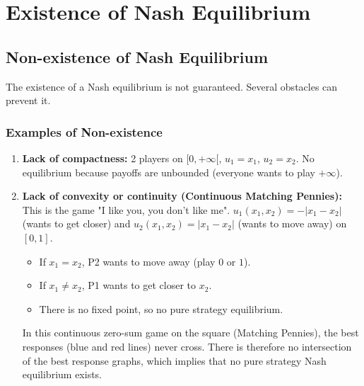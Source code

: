 \chapter{Existence of Nash Equilibrium}

\section{Non-existence of Nash Equilibrium}

The existence of a Nash equilibrium is not guaranteed. Several obstacles can prevent it.

\subsection{Examples of Non-existence}
\begin{enumerate}
    \item \textbf{Lack of compactness:} 2 players on $[0, +\infty[$, $u_1 = x_1$, $u_2 = x_2$. No equilibrium because payoffs are unbounded (everyone wants to play $+\infty$).
    \item \textbf{Lack of convexity or continuity (Continuous Matching Pennies):}
    This is the game "I like you, you don't like me". $u_1(x_1, x_2) = -|x_1 - x_2|$ (wants to get closer) and $u_2(x_1, x_2) = |x_1 - x_2|$ (wants to move away) on $[0,1]$.
    \begin{itemize}
        \item If $x_1 = x_2$, P2 wants to move away (play $0$ or $1$).
        \item If $x_1 \ne x_2$, P1 wants to get closer to $x_2$.
        \item There is no fixed point, so no pure strategy equilibrium.
    \end{itemize}
    
\begin{center}
\end{center}
\begin{figureexplanation}
In this continuous zero-sum game on the square (Matching Pennies), the best responses (blue and red lines) never cross. There is therefore no intersection of the best response graphs, which implies that no pure strategy Nash equilibrium exists.
\end{figureexplanation}

\end{enumerate}

